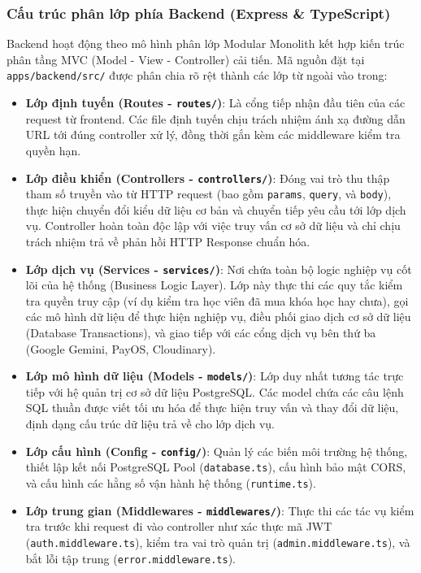 \documentclass[../DoAn.tex]{subfiles}
\begin{document}
\subsubsection{Cấu trúc phân lớp phía Backend (Express \& TypeScript)}
Backend hoạt động theo mô hình phân lớp Modular Monolith kết hợp kiến trúc phân tầng MVC (Model - View - Controller) cải tiến. Mã nguồn đặt tại \texttt{apps/backend/src/} được phân chia rõ rệt thành các lớp từ ngoài vào trong:
\begin{itemize}
    \item \textbf{Lớp định tuyến (Routes - \texttt{routes/})}: Là cổng tiếp nhận đầu tiên của các request từ frontend. Các file định tuyến chịu trách nhiệm ánh xạ đường dẫn URL tới đúng controller xử lý, đồng thời gắn kèm các middleware kiểm tra quyền hạn.
    \item \textbf{Lớp điều khiển (Controllers - \texttt{controllers/})}: Đóng vai trò thu thập tham số truyền vào từ HTTP request (bao gồm \texttt{params}, \texttt{query}, và \texttt{body}), thực hiện chuyển đổi kiểu dữ liệu cơ bản và chuyển tiếp yêu cầu tới lớp dịch vụ. Controller hoàn toàn độc lập với việc truy vấn cơ sở dữ liệu và chỉ chịu trách nhiệm trả về phản hồi HTTP Response chuẩn hóa.
    \item \textbf{Lớp dịch vụ (Services - \texttt{services/})}: Nơi chứa toàn bộ logic nghiệp vụ cốt lõi của hệ thống (Business Logic Layer). Lớp này thực thi các quy tắc kiểm tra quyền truy cập (ví dụ kiểm tra học viên đã mua khóa học hay chưa), gọi các mô hình dữ liệu để thực hiện nghiệp vụ, điều phối giao dịch cơ sở dữ liệu (Database Transactions), và giao tiếp với các cổng dịch vụ bên thứ ba (Google Gemini, PayOS, Cloudinary).
    \item \textbf{Lớp mô hình dữ liệu (Models - \texttt{models/})}: Lớp duy nhất tương tác trực tiếp với hệ quản trị cơ sở dữ liệu PostgreSQL. Các model chứa các câu lệnh SQL thuần được viết tối ưu hóa để thực hiện truy vấn và thay đổi dữ liệu, định dạng cấu trúc dữ liệu trả về cho lớp dịch vụ.
    \item \textbf{Lớp cấu hình (Config - \texttt{config/})}: Quản lý các biến môi trường hệ thống, thiết lập kết nối PostgreSQL Pool (\texttt{database.ts}), cấu hình bảo mật CORS, và cấu hình các hằng số vận hành hệ thống (\texttt{runtime.ts}).
    \item \textbf{Lớp trung gian (Middlewares - \texttt{middlewares/})}: Thực thi các tác vụ kiểm tra trước khi request đi vào controller như xác thực mã JWT (\texttt{auth.middleware.ts}), kiểm tra vai trò quản trị (\texttt{admin.middleware.ts}), và bắt lỗi tập trung (\texttt{error.middleware.ts}).
\end{itemize}
\end{document}
